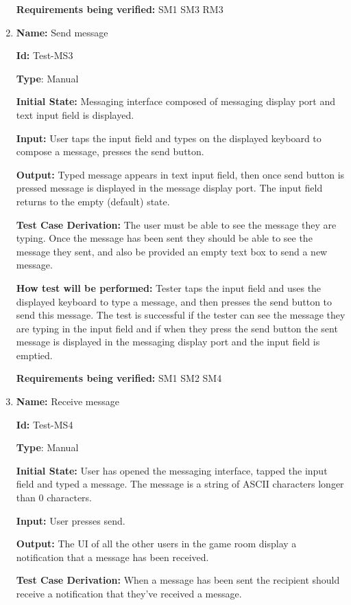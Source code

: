 \documentclass[12pt, titlepage]{article}
\begin{document}
\begin{enumerate}
\textbf{Requirements being verified: } SM1 SM3 RM3

\item{\textbf{Name:} Send message} \label{itm:Test-MS3}

\textbf{Id:} Test-MS3

\textbf{Type}: Manual

\textbf{Initial State:} Messaging interface composed of messaging display port and text input field is displayed.

\textbf{Input:} User taps the input field and types on the displayed keyboard to compose a message, presses the send button.

\textbf{Output:} Typed message appears in text input field, then once send button is pressed message is displayed in the message display port. The input field returns to the empty (default) state.

\textbf{Test Case Derivation:}
The user must be able to see the message they are typing. Once the message has been sent they should be able to see the message they sent, and also be provided an empty text box to send a new message.

\textbf{How test will be performed:}
Tester taps the input field and uses the displayed keyboard to type a message, and then presses the send button to send this message. The test is successful if the tester can see the message they are typing in the input field and if when they press the send button the sent message is displayed in the messaging display port and the input field is emptied.

\textbf{Requirements being verified: } SM1 SM2 SM4

\item{\textbf{Name:} Receive message} \label{itm:Test-MS4}

\textbf{Id:} Test-MS4

\textbf{Type}: Manual

\textbf{Initial State:} User has opened the messaging interface, tapped the input field and typed a message. The message is a string of ASCII characters longer than 0 characters.

\textbf{Input:} User presses send.

\textbf{Output:} The UI of all the other users in the game room display a notification that a message has been received.

\textbf{Test Case Derivation:}
When a message has been sent the recipient should receive a notification that they've received a message.


\end{enumerate}
\end{document}
